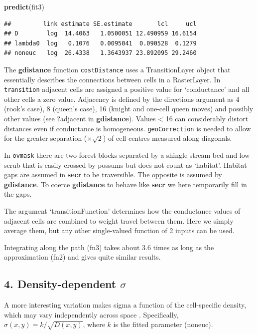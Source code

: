\documentclass[
]{book}
\newenvironment{Shaded}{\begin{snugshade}}{\end{snugshade}}
\newcommand{\FunctionTok}[1]{\textcolor[rgb]{0.13,0.29,0.53}{\textbf{#1}}}
\newcommand{\NormalTok}[1]{#1}
\begin{document}
\begin{Shaded}
\begin{Highlighting}[]
\FunctionTok{predict}\NormalTok{(fit3)}
\end{Highlighting}
\end{Shaded}

\begin{verbatim}
##         link estimate SE.estimate       lcl     ucl
## D        log  14.4063   1.0500051 12.490959 16.6154
## lambda0  log   0.1076   0.0095041  0.090528  0.1279
## noneuc   log  26.4338   1.3643937 23.892095 29.2460
\end{verbatim}

The \textbf{gdistance} function \texttt{costDistance} uses a TransitionLayer object that essentially describes the connections between cells in a RasterLayer. In \texttt{transition} adjacent cells are assigned a positive value for `conductance' and all other cells a zero value. Adjacency is defined by the directions argument as 4 (rook's case), 8 (queen's case), 16 (knight and one-cell queen moves) and possibly other values (see ?adjacent in \textbf{gdistance}). Values \textless{} 16 can considerably distort distances even if conductance is homogeneous. \texttt{geoCorrection} is needed to allow for the greater separation (\(\times \sqrt 2\)) of cell centres measured along diagonals.

In \texttt{ovmask} there are two forest blocks separated by a shingle stream bed and low scrub that is easily crossed by possums but does not count as `habitat'. Habitat gaps are assumed in \textbf{secr} to be traversible. The opposite is assumed by \textbf{gdistance}. To coerce \textbf{gdistance} to behave like \textbf{secr} we here temporarily fill in the gaps.

The argument `transitionFunction' determines how the conductance values of adjacent cells are combined to weight travel between them. Here we simply average them, but any other single-valued function of 2 inputs can be used.

Integrating along the path (fn3) takes about 3.6 times as long as the approximation (fn2) and gives quite similar results.

\subsection{\texorpdfstring{4. Density-dependent \(\sigma\)}{4. Density-dependent \textbackslash sigma}}\label{density-dependent-sigma}

A more interesting variation makes sigma a function of the cell-specific density, which may vary independently across space \citep{edjq16}. Specifically, \(\sigma(x,y) = k / \sqrt{D(x,y)}\), where \(k\) is the fitted parameter (noneuc).
\end{document}
